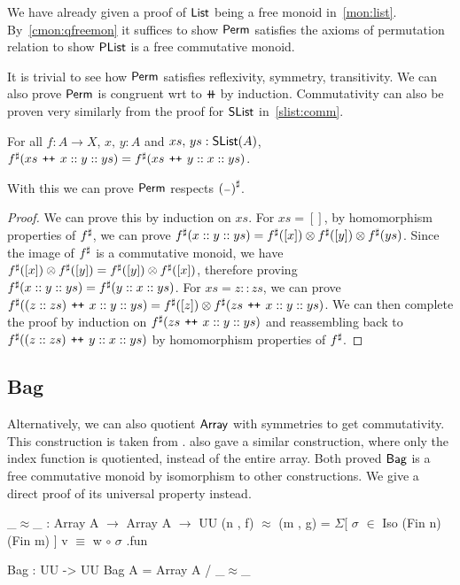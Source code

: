 We have already given a proof of $\operatorname{\mathsf{List}}$ being a free monoid in~\ref{mon:list}.
By~\ref{cmon:qfreemon} it suffices to show $\operatorname{\mathsf{Perm}}$ satisfies the axioms of permutation relation
to show $\operatorname{\mathsf{PList}}$ is a free commutative monoid.

It is trivial to see how $\operatorname{\mathsf{Perm}}$ satisfies reflexivity, symmetry, transitivity.
We can also prove $\operatorname{\mathsf{Perm}}$ is congruent wrt to $\doubleplus$ by induction.
Commutativity can also be proven very similarly from the proof for $\operatorname{\mathsf{SList}}$ in~\ref{slist:comm}.

\begin{theorem}
    For all $f : A \to X$, $x, \, y : A$ and $xs, \, ys : \operatorname{\mathsf{SList}}(A)$,
    ${f}^{\sharp}(xs\,\mathbin{\text{\ttfamily\upshape ++}}\,x :: y :: ys) = {f}^{\sharp}(xs\,\mathbin{\text{\ttfamily\upshape ++}}\,y :: x :: ys)$.
\end{theorem}

With this we can prove $\operatorname{\mathsf{Perm}}$ respects ${({\scriptstyle{-}})}^{\sharp}$.

\begin{proof}
    We can prove this by induction on $xs$. For $xs = []$, by homomorphism properties of ${f}^{\sharp}$,
    we can prove ${f}^{\sharp}(x :: y :: ys) = {f}^{\sharp}([ x ]) \otimes {f}^{\sharp}([ y ]) \otimes {f}^{\sharp}(ys)$.
    Since the image of ${f}^{\sharp}$ is a commutative monoid, we have
    ${f}^{\sharp}([ x ]) \otimes {f}^{\sharp}([ y ]) = {f}^{\sharp}([ y ]) \otimes {f}^{\sharp}([ x ])$, therefore proving
    ${f}^{\sharp}(x :: y :: ys) = {f}^{\sharp}(y :: x :: ys)$. For $xs = z :: zs$, we can prove
    ${f}^{\sharp}((z :: zs)\,\mathbin{\text{\ttfamily\upshape ++}}\,x :: y :: ys) = {f}^{\sharp}([ z ]) \otimes {f}^{\sharp}(zs\,\mathbin{\text{\ttfamily\upshape ++}}\,x :: y :: ys)$.
    We can then complete the proof by induction on ${f}^{\sharp}(zs\,\mathbin{\text{\ttfamily\upshape ++}}\,x :: y :: ys)$ and reassembling
    back to ${f}^{\sharp}((z :: zs)\,\mathbin{\text{\ttfamily\upshape ++}}\,y :: x :: ys)$ by homomorphism properties of ${f}^{\sharp}$.
\end{proof}

\subsection{Bag}\label{cmon:bag}
Alternatively, we can also quotient $\operatorname{\mathsf{Array}}$ with symmetries to get commutativity.
This construction is taken from \cite{choudhuryFreeCommutativeMonoids2023}. \cite{joramConstructiveFinalSemantics2023}
also gave a similar construction, where only the index function is quotiented, instead of
the entire array. Both proved $\operatorname{\mathsf{Bag}}$ is a free commutative monoid by isomorphism to
other constructions. We give a direct proof of its universal property instead.

\begin{code}
_$\approx$_ : Array A $\to$ Array A $\to$ UU
(n , f) $\approx$ (m , g) = $\Sigma$[ $\sigma$ $\in$ Iso (Fin n) (Fin m) ] v $\equiv$ w $\circ$ $\sigma$ .fun

Bag : UU -> UU
Bag A = Array A / _$\approx$_
\end{code}

